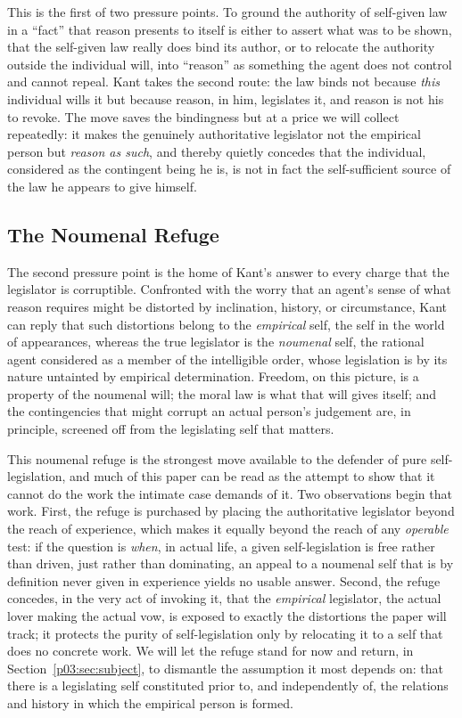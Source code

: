 \documentclass[11pt,a4paper]{article}
\begin{document}
This is the first of two pressure points. To ground the authority of self-given law in a ``fact'' that reason presents to itself is either to assert what was to be shown, that the self-given law really does bind its author, or to relocate the authority outside the individual will, into ``reason'' as something the agent does not control and cannot repeal. Kant takes the second route: the law binds not because \emph{this} individual wills it but because reason, in him, legislates it, and reason is not his to revoke. The move saves the bindingness but at a price we will collect repeatedly: it makes the genuinely authoritative legislator not the empirical person but \emph{reason as such}, and thereby quietly concedes that the individual, considered as the contingent being he is, is not in fact the self-sufficient source of the law he appears to give himself.

\subsection{The Noumenal Refuge}

The second pressure point is the home of Kant's answer to every charge that the legislator is corruptible. Confronted with the worry that an agent's sense of what reason requires might be distorted by inclination, history, or circumstance, Kant can reply that such distortions belong to the \emph{empirical} self, the self in the world of appearances, whereas the true legislator is the \emph{noumenal} self, the rational agent considered as a member of the intelligible order, whose legislation is by its nature untainted by empirical determination. Freedom, on this picture, is a property of the noumenal will; the moral law is what that will gives itself; and the contingencies that might corrupt an actual person's judgement are, in principle, screened off from the legislating self that matters.

This noumenal refuge is the strongest move available to the defender of pure self-legislation, and much of this paper can be read as the attempt to show that it cannot do the work the intimate case demands of it. Two observations begin that work. First, the refuge is purchased by placing the authoritative legislator beyond the reach of experience, which makes it equally beyond the reach of any \emph{operable} test: if the question is \emph{when}, in actual life, a given self-legislation is free rather than driven, just rather than dominating, an appeal to a noumenal self that is by definition never given in experience yields no usable answer. Second, the refuge concedes, in the very act of invoking it, that the \emph{empirical} legislator, the actual lover making the actual vow, is exposed to exactly the distortions the paper will track; it protects the purity of self-legislation only by relocating it to a self that does no concrete work. We will let the refuge stand for now and return, in Section~\ref{p03:sec:subject}, to dismantle the assumption it most depends on: that there is a legislating self constituted prior to, and independently of, the relations and history in which the empirical person is formed.
\end{document}
